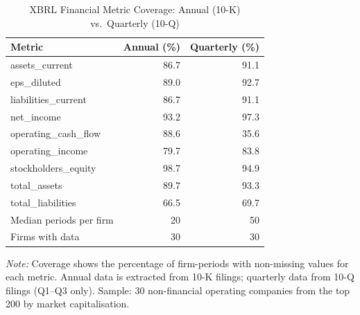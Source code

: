 \begin{table}[htbp]
\centering
\caption{XBRL Financial Metric Coverage: Annual (10-K) vs.\ Quarterly (10-Q)}
\label{tab:xbrl_coverage}
\begin{tabular}{lrr}
\toprule
Metric & Annual (\%) & Quarterly (\%) \\
\midrule
assets\_current & 86.7 & 91.1 \\
eps\_diluted & 89.0 & 92.7 \\
liabilities\_current & 86.7 & 91.1 \\
net\_income & 93.2 & 97.3 \\
operating\_cash\_flow & 88.6 & 35.6 \\
operating\_income & 79.7 & 83.8 \\
stockholders\_equity & 98.7 & 94.9 \\
total\_assets & 89.7 & 93.3 \\
total\_liabilities & 66.5 & 69.7 \\
\midrule
Median periods per firm & 20 & 50 \\
Firms with data & 30 & 30 \\
\bottomrule
\end{tabular}
\begin{tablenotes}
\small
\item \textit{Note:} Coverage shows the percentage of firm-periods with non-missing
values for each metric. Annual data is extracted from 10-K filings; quarterly data
from 10-Q filings (Q1--Q3 only). Sample: 30 non-financial operating
companies from the top 200 by market capitalisation.
\end{tablenotes}
\end{table}

